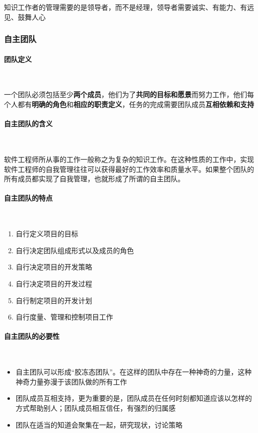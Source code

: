 知识工作者的管理需要的是领导者，而不是经理，领导者需要诚实、有能力、有远见、鼓舞人心

\subsubsection{自主团队}

\paragraph{团队定义}~{} \par
一个团队必须包括至少\textbf{两个成员}，他们为了\textbf{共同的目标和愿景}而努力工作，他们每个人都有\textbf{明确的角色}和\textbf{相应的职责定义}，任务的完成需要团队成员\textbf{互相依赖和支持}

\paragraph{自主团队的含义}~{} \par
软件工程师所从事的工作一般称之为复杂的知识工作。在这种性质的工作中，实现软件工程师的自我管理往往可以获得最好的工作效率和质量水平。如果整个团队的所有成员都实现了自我管理，也就形成了所谓的自主团队。

\paragraph{自主团队的特点}~{} \par
\vspace{-0.8em}
\begin{multicols}{3}
    \begin{enumerate}[label=\arabic*.]
        \item 自行定义项目的目标
        \item 自行决定团队组成形式以及成员的角色
        \item 自行决定项目的开发策略
        \item 自行决定项目的开发过程
        \item 自行制定项目的开发计划
        \item 自行度量、管理和控制项目工作
    \end{enumerate}
\end{multicols}
\vspace{-1em}

\paragraph{自主团队的必要性}~{} \par
\begin{itemize}
    \item 自主团队可以形成“胶冻态团队”。在这样的团队中存在一种神奇的力量，这种神奇力量弥漫于该团队做的所有工作
    \item 团队成员互相支持，更为重要的是，团队成员在任何时刻都知道应该以怎样的方式帮助别人；团队成员相互信任，有强烈的归属感
    \item 团队在适当的知道会聚集在一起，研究现状，讨论策略
\end{itemize}

